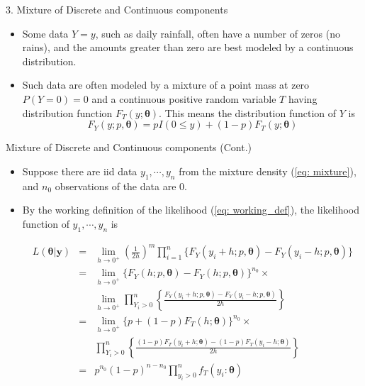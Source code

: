 \documentclass{beamer}
\begin{document}
 

 \begin{frame}{3. Mixture of Discrete and Continuous components}
        \begin{itemize}
            \item  Some data $Y = y$, such as daily rainfall, often have a number of zeros (no rains), and the amounts greater than zero are best modeled by a continuous distribution.
            \item Such data are often modeled by
            a mixture of a point mass at zero $P(Y = 0) = 0$ and a continuous positive random variable $T$ having distribution function $F_{T}(y;\boldsymbol{\theta}).$ This means the distribution function of $Y$ is
            \begin{equation}
                F_{Y}(y;p, \boldsymbol{\theta}) = pI(0 \leq y) + (1-p)F_{T}(y;\boldsymbol{\theta}) \label{eq: mixture}
            \end{equation}
            
        \end{itemize}
    \end{frame}
    

    
    
    
 \begin{frame}{Mixture of Discrete and Continuous components (Cont.)}
        \begin{itemize}
            \item Suppose there are iid data $y_{1}, \cdots, y_{n}$ from the mixture density (\ref{eq: mixture}), and $n_{0}$ observations of the data are 0.
            \item By the working definition of the likelihood  (\ref{eq: working_def}), the likelihood function of $y_{1}, \cdots, y_{n}$ is
       \begin{small}
        \begin{eqnarray}
       L(\boldsymbol{\theta}|\boldsymbol{y})  & = & \lim_{h \rightarrow 0^{+}} \left(\frac{1}{2h}\right)^{m}\prod^{n}_{i=1}\{F_{Y}(y_{i}+h; p, \boldsymbol{\theta}) - F_{Y}(y_{i}-h; p, \boldsymbol{\theta})\}\nonumber\\
        & = & \lim_{h \rightarrow 0^{+}} \{F_{Y}(h; p, \boldsymbol{\theta}) - F_{Y}(h; p, \boldsymbol{\theta})\}^{n_{0}} \times \nonumber\\ 
        & & \lim_{h \rightarrow 0^{+}} \prod^{n}_{Y_{i} > 0}\left\{\frac{F_{Y}(y_{i}+h; p, \boldsymbol{\theta}) - F_{Y}(y_{i}-h; p, \boldsymbol{\theta})}{2h}\right\}\nonumber\\
        & = & \lim_{h \rightarrow 0^{+}} \{p + (1-p)F_{T}(h; \boldsymbol{\theta})\}^{n_{0}} \times \nonumber\\
       & &  \prod^{n}_{Y_{i} > 0}\left\{\frac{(1-p)F_{T}(y_{i}+h; \boldsymbol{\theta}) - (1-p)F_{T}(y_{i}-h; \boldsymbol{\theta})}{2h}\right\} \nonumber\\ 
       & = & p^{n_{0}}(1-p)^{n-n_{0}} \prod^{n}_{y_{i} > 0} f_{T}(y_{i}:\boldsymbol{\theta}) \nonumber
            \end{eqnarray}
        \end{small}
        \end{itemize}
    \end{frame}
\end{document}
